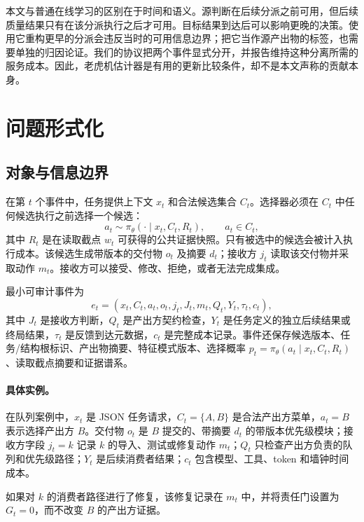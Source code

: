 \documentclass[UTF8,twocolumn]{ctexart}
\begin{document}
本文与普通在线学习的区别在于时间和语义。源判断在后续分派之前可用，但后续质量结果只有在该分派执行之后才可用。目标结果到达后可以影响更晚的决策。使用它重构更早的分派会违反当时的可用信息边界；把它当作源产出物的标签，也需要单独的归因论证。我们的协议把两个事件显式分开，并报告维持这种分离所需的服务成本。因此，老虎机估计器是有用的更新比较条件，却不是本文声称的贡献本身。

\section{问题形式化}
\label{sec:problem}

\subsection{对象与信息边界}
在第 $t$ 个事件中，任务提供上下文 $x_t$ 和合法候选集合 $C_t$。选择器必须在 $C_t$ 中任何候选执行之前选择一个候选：
\begin{equation}
 a_t\sim\pi_{\theta}(\cdot\mid x_t,C_t,R_t),\qquad a_t\in C_t,
 \label{eq:choice}
\end{equation}
其中 $R_t$ 是在读取截点 $w_t$ 可获得的公共证据快照。只有被选中的候选会被计入执行成本。该候选生成带版本的交付物 $o_t$ 及摘要 $d_t$；接收方 $j_t$ 读取该交付物并采取动作 $m_t$。接收方可以接受、修改、拒绝，或者无法完成集成。

最小可审计事件为
\begin{equation}
 e_t=(x_t,C_t,a_t,o_t,j_t,J_t,m_t,Q_t,Y_t,\tau_t,c_t),
 \label{eq:event}
\end{equation}
其中 $J_t$ 是接收方判断，$Q_t$ 是产出方契约检查，$Y_t$ 是任务定义的独立后续结果或终局结果，$\tau_t$ 是反馈到达元数据，$c_t$ 是完整成本记录。事件还保存候选版本、任务/结构根标识、产出物摘要、特征模式版本、选择概率 $p_t=\pi_\theta(a_t\mid x_t,C_t,R_t)$、读取截点摘要和证据谱系。

\paragraph{具体实例。} 在队列案例中，$x_t$ 是 JSON 任务请求，$C_t=\{A,B\}$ 是合法产出方菜单，$a_t=B$ 表示选择产出方 $B$。交付物 $o_t$ 是 $B$ 提交的、带摘要 $d_t$ 的带版本优先级模块；接收方字段 $j_t=k$ 记录 $k$ 的导入、测试或修复动作 $m_t$；$Q_t$ 只检查产出方负责的队列和优先级路径；$Y_t$ 是后续消费者结果；$c_t$ 包含模型、工具、token 和墙钟时间成本。

如果对 $k$ 的消费者路径进行了修复，该修复记录在 $m_t$ 中，并将责任门设置为 $G_t=0$，而不改变 $B$ 的产出方证据。
\end{document}
